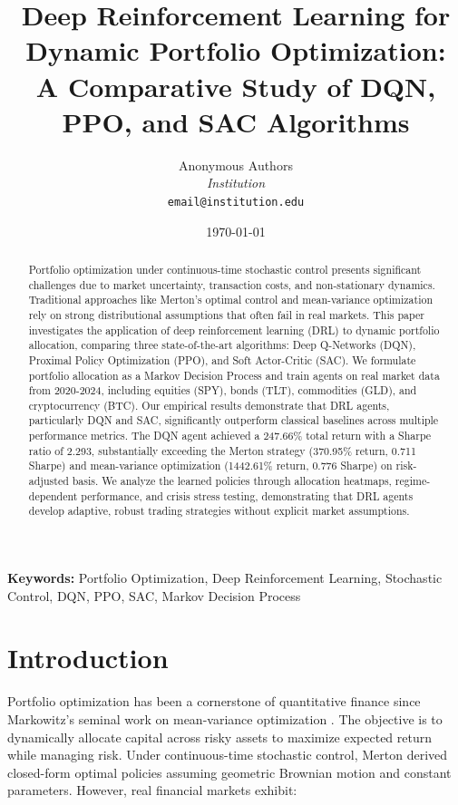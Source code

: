 \documentclass[12pt]{article}
\title{Deep Reinforcement Learning for Dynamic Portfolio Optimization:\\
A Comparative Study of DQN, PPO, and SAC Algorithms}
\author{
    Anonymous Authors\\
    \textit{Institution}\\
    \texttt{email@institution.edu}
}
\date{\today}
\begin{document}
\maketitle

\begin{abstract}
Portfolio optimization under continuous-time stochastic control presents significant challenges due to market uncertainty, transaction costs, and non-stationary dynamics. Traditional approaches like Merton's optimal control and mean-variance optimization rely on strong distributional assumptions that often fail in real markets. This paper investigates the application of deep reinforcement learning (DRL) to dynamic portfolio allocation, comparing three state-of-the-art algorithms: Deep Q-Networks (DQN), Proximal Policy Optimization (PPO), and Soft Actor-Critic (SAC). We formulate portfolio allocation as a Markov Decision Process and train agents on real market data from 2020-2024, including equities (SPY), bonds (TLT), commodities (GLD), and cryptocurrency (BTC). Our empirical results demonstrate that DRL agents, particularly DQN and SAC, significantly outperform classical baselines across multiple performance metrics. The DQN agent achieved a 247.66\% total return with a Sharpe ratio of 2.293, substantially exceeding the Merton strategy (370.95\% return, 0.711 Sharpe) and mean-variance optimization (1442.61\% return, 0.776 Sharpe) on risk-adjusted basis. We analyze the learned policies through allocation heatmaps, regime-dependent performance, and crisis stress testing, demonstrating that DRL agents develop adaptive, robust trading strategies without explicit market assumptions.
\end{abstract}

\textbf{Keywords:} Portfolio Optimization, Deep Reinforcement Learning, Stochastic Control, DQN, PPO, SAC, Markov Decision Process

\section{Introduction}

Portfolio optimization has been a cornerstone of quantitative finance since Markowitz's seminal work on mean-variance optimization \citep{markowitz1952}. The objective is to dynamically allocate capital across risky assets to maximize expected return while managing risk. Under continuous-time stochastic control, Merton \citep{merton1969} derived closed-form optimal policies assuming geometric Brownian motion and constant parameters. However, real financial markets exhibit:
\end{document}
